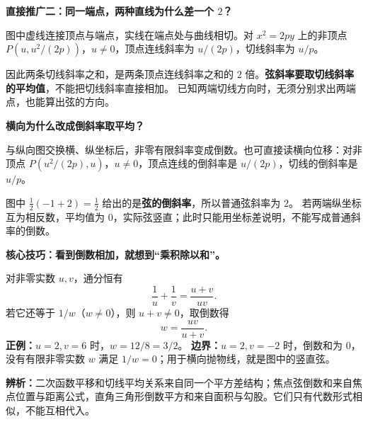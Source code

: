 \clearpage
\begin{explanationbox}
\textbf{直接推广二：同一端点，两种直线为什么差一个 $2$？}
\begin{center}\end{center}
图中虚线连接顶点与端点，实线在端点处与曲线相切。对 $x^2=2py$ 上的非顶点 $P(u,u^2/(2p))$，$u\ne0$，顶点连线斜率为 $u/(2p)$，切线斜率为 $u/p$。

因此两条切线斜率之和，是两条顶点连线斜率之和的 $2$ 倍。\textbf{弦斜率要取切线斜率的平均值}，不能把切线斜率直接相加。
已知两端切线方向时，无须分别求出两端点，也能算出弦的方向。
\end{explanationbox}

\clearpage
\begin{explanationbox}
\textbf{横向为什么改成倒斜率取平均？}
\begin{center}\end{center}
与纵向图交换横、纵坐标后，非零有限斜率变成倒数。也可直接读横向位移：对非顶点 $P(u^2/(2p),u)$，$u\ne0$，顶点连线的倒斜率是 $u/(2p)$，切线的倒斜率是 $u/p$。

图中 $\frac12(-1+2)=\frac12$ 给出的是\textbf{弦的倒斜率}，所以普通弦斜率为 $2$。
若两端纵坐标互为相反数，平均值为 $0$，实际弦竖直；此时只能用坐标差说明，不能写成普通斜率的倒数。
\end{explanationbox}

\clearpage
\begin{explanationbox}
\textbf{核心技巧：看到倒数相加，就想到“乘积除以和”。}
\begin{center}\end{center}
对非零实数 $u,v$，通分恒有
\[
\frac1u+\frac1v=\frac{u+v}{uv}.
\]
若它还等于 $1/w$（$w\ne0$），则 $u+v\ne0$，取倒数得
\[
\boxed{w=\frac{uv}{u+v}}.
\]
\textbf{正例：}$u=2,v=6$ 时，$w=12/8=3/2$。
\textbf{边界：}$u=2,v=-2$ 时，倒数和为 $0$，没有有限非零实数 $w$ 满足 $1/w=0$；用于横向抛物线，就是图中的竖直弦。

\textbf{辨析：}二次函数平移和切线平均关系来自同一个平方差结构；焦点弦倒数和来自焦点位置与距离公式，直角三角形倒数平方和来自面积与勾股。它们只有代数形式相似，不能互相代入。
\end{explanationbox}

